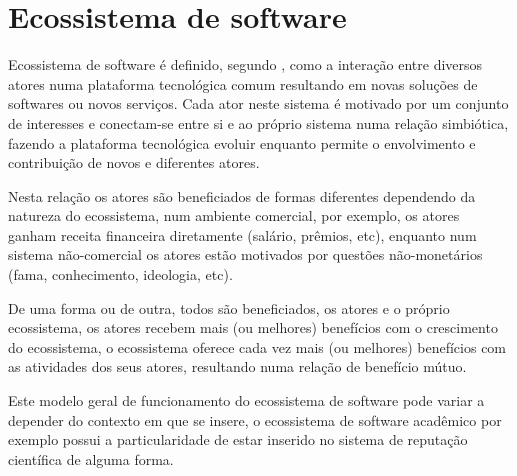 \section{Ecossistema de software}


Ecossistema de software é definido, segundo ,
como a interação entre diversos atores numa plataforma tecnológica comum
resultando em novas soluções de softwares ou novos serviços. Cada ator neste
sistema é motivado por um conjunto de interesses e conectam-se entre si e ao
próprio sistema numa relação simbiótica, fazendo a plataforma tecnológica
evoluir enquanto permite o envolvimento e contribuição de novos e diferentes
atores.

Nesta relação os atores são beneficiados de formas diferentes dependendo da
natureza do ecossistema, num ambiente comercial, por exemplo, os atores ganham
receita financeira diretamente (salário, prêmios, etc), enquanto num sistema
não-comercial os atores estão motivados por questões não-monetários (fama,
conhecimento, ideologia, etc).

De uma forma ou de outra, todos são beneficiados, os atores e o próprio
ecossistema, os atores recebem mais (ou melhores) benefícios com o crescimento
do ecossistema, o ecossistema oferece cada vez mais (ou melhores) benefícios
com as atividades dos seus atores, resultando numa relação de benefício
mútuo.

Este modelo geral de funcionamento do ecossistema de software pode variar a
depender do contexto em que se insere, o ecossistema de software acadêmico por
exemplo possui a particularidade de estar inserido no sistema de reputação
científica de alguma forma.





